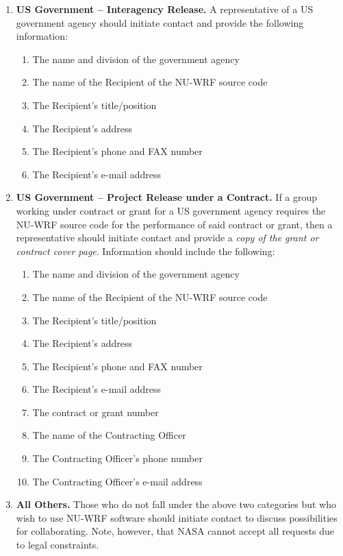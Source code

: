 \begin{enumerate}
\item \textbf{US Government -- Interagency Release.}
A representative of a US government agency should initiate contact and provide
the following information:
\begin{enumerate}
  \item The name and division of the government agency
  \item The name of the Recipient of the NU-WRF source code
  \item The Recipient's title/position
  \item The Recipient's address
  \item The Recipient's phone and FAX number
  \item The Recipient's e-mail address
\end{enumerate}

\item \textbf{US Government -- Project Release under a Contract.}
If a group working under contract or grant for a US government agency requires
the NU-WRF source code for the performance of said contract or grant, then
a representative should initiate contact and provide a \emph{copy of the grant
or contract cover page}. Information should include the following:
\begin{enumerate}
  \item The name and division of the government agency
  \item The name of the Recipient of the NU-WRF source code
  \item The Recipient's title/position
  \item The Recipient's address
  \item The Recipient's phone and FAX number
  \item The Recipient's e-mail address
  \item The contract or grant number
  \item The name of the Contracting Officer
  \item The Contracting Officer's phone number
  \item The Contracting Officer's e-mail address
\end{enumerate}

\item \textbf{All Others.}
Those who do not fall under the above two categories but who wish to use
NU-WRF software should initiate contact to discuss possibilities for 
collaborating. Note, however, that NASA cannot accept all requests due to
legal constraints.
\end{enumerate}

